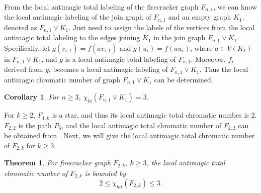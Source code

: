 \documentclass[12pt]{article}
\newtheorem{theorem}{Theorem}[section]
\newtheorem{corollary}{Corollary}[section]
\begin{document}
From the local antimagic total labeling of the firecracker graph $F_{n,1}$, we can know the local antimagic labeling of the join graph of $F_{n,1}$ and an empty graph $K_1$, denoted as $F_{n,1}\vee K_{1}$. Just need to assign the labels of the vertices from the local antimagic total labeling to the edges joining $K_1$ in the join graph $F_{n,1}\vee K_{1}$. Specifically, let $g(v_{i,1})=f(av_{i,1})$ and $g(u_{i})=f(au_{i})$, where $a\in V(K_{1})$ in  $F_{n,1}\vee K_{1}$, and $g$ is a local antimagic total labeling of $F_{n,1}$. Moreover, $f$, derived from $g$, becomes a local antimagic labeling of $F_{n,1}\vee K_{1}$. Thus the local antimagic chromatic number of graph $F_{n,1}\vee K_{1}$ can be determined.

\begin{corollary}
  For $n\geq 3$, $\chi_{la}(F_{n,1}\vee K_{1})=3$.
\end{corollary}

For $k\geq 2$, $F_{1,k}$ is a star, and thus its local antimagic total chromatic number is 2. $F_{2,2}$ is the path $P_{6}$, and the local antimagic total chromatic number of $F_{2,2}$ can be obtained from \cite[Theorem 3.4]{Lau-7}. Next, we will give the local antimagic total chromatic number of $F_{2,k}$ for $k\geq 3$.

\begin{theorem}
  For firecracker graph $F_{2,k}$, $k\geq 3$, the local antimagic total chromatic number of $F_{2,k}$ is bounded by
\begin{equation*}
2\leq \chi_{lat}(F_{2,k})\leq 3.
\end{equation*}
\end{theorem}
\end{document}
